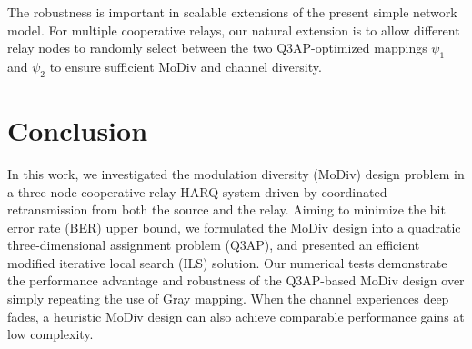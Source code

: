 \documentclass[journal]{IEEEtran}
\begin{document}
The robustness is important in scalable extensions of the present simple network
model. For multiple cooperative relays, our natural extension is to allow
different relay nodes to randomly select between the two Q3AP-optimized mappings
$\psi_1$ and $\psi_2$ to ensure sufficient MoDiv and channel diversity. 

\section{Conclusion}
\label{sec:conclusion}
In this work, we investigated the modulation diversity (MoDiv) design problem in
a three-node cooperative relay-HARQ system driven by coordinated retransmission
from both the source and the relay. Aiming to minimize the bit error rate (BER)
upper bound, we formulated the MoDiv design into a quadratic three-dimensional
assignment problem (Q3AP), and presented an efficient modified iterative local
search (ILS) solution. Our numerical tests demonstrate the performance advantage
and robustness of the Q3AP-based MoDiv design over simply repeating the use of
Gray mapping. When the channel experiences deep fades, a heuristic MoDiv design
can also achieve comparable performance gains at low complexity.













%




\end{document}
